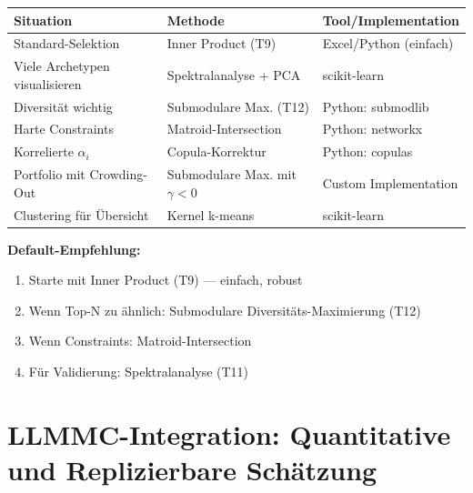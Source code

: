 \begin{tcolorbox}[colback=orange!5!white, colframe=orange!75!black,
    title=\textbf{Praktische Empfehlungen}]

\renewcommand{\arraystretch}{1.3}
\begin{tabular}{@{}p{3.5cm}p{4cm}p{4cm}@{}}
\toprule
\textbf{Situation} & \textbf{Methode} & \textbf{Tool/Implementation} \\
\midrule
Standard-Selektion & Inner Product (T9) & Excel/Python (einfach) \\
Viele Archetypen visualisieren & Spektralanalyse + PCA & scikit-learn \\
Diversität wichtig & Submodulare Max. (T12) & Python: submodlib \\
Harte Constraints & Matroid-Intersection & Python: networkx \\
Korrelierte $\alpha_i$ & Copula-Korrektur & Python: copulas \\
Portfolio mit Crowding-Out & Submodulare Max. mit $\gamma < 0$ & Custom Implementation \\
Clustering für Übersicht & Kernel k-means & scikit-learn \\
\bottomrule
\end{tabular}

\medskip
\textbf{Default-Empfehlung:}
\begin{enumerate}[nosep]
    \item Starte mit Inner Product (T9) --- einfach, robust
    \item Wenn Top-N zu ähnlich: Submodulare Diversitäts-Maximierung (T12)
    \item Wenn Constraints: Matroid-Intersection
    \item Für Validierung: Spektralanalyse (T11)
\end{enumerate}

\end{tcolorbox}


\section{LLMMC-Integration: Quantitative und Replizierbare Schätzung}
\label{sec:hhh-llmmc}

